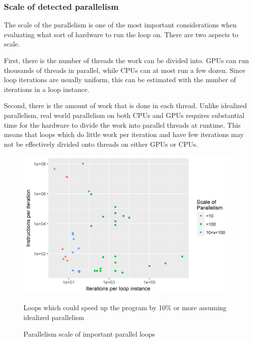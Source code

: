 \documentclass[12pt,twoside]{reedthesis}
\begin{document}
		\subsubsection{Scale of detected parallelism}
		
		The scale of the parallelism is one of the most important considerations when evaluating what sort of hardware to run the loop on. There are two aspects to scale. 
		
		First, there is the number of threads the work can be divided into. GPUs can run thousands of threads in parallel, while CPUs can at most run a few dozen. Since loop iterations are usually uniform, this can be estimated with the number of iterations in a loop instance. 
		
		Second, there is the amount of work that is done in each thread. Unlike idealized parallelism, real world parallelism on both CPUs and GPUs requires substantial time for the hardware to divide the work into parallel threads at runtime. This means that loops which do little work per iteration and have few iterations may not be effectively divided onto threads on either GPUs or CPUs. 
		
		\begin{figure}
			\caption{Parallelism scale of important parallel loops}
			\label{fig:paralleism-scale}
			
			\begin{minipage}{0.6\textwidth} %
				\includegraphics[scale=0.7]{plots/categorized_conflicts.png}
				{\footnotesize Loops which could speed up the program by 10\% or more assuming idealized parallelism \par}
			\end{minipage}
		\end{figure}
		
\end{document}
